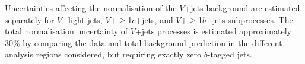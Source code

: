 Uncertainties affecting the normalisation of the $V$+jets background are estimated separately for $V$+light-jets, $V$+$\geq$1$c$+jets,
and $V$+$\geq$1$b$+jets subprocesses. The total normalisation uncertainty of $V$+jets processes is estimated approximately 30\% by comparing the
data and total background prediction in the different analysis regions considered, but requiring exactly zero $b$-tagged jets.





